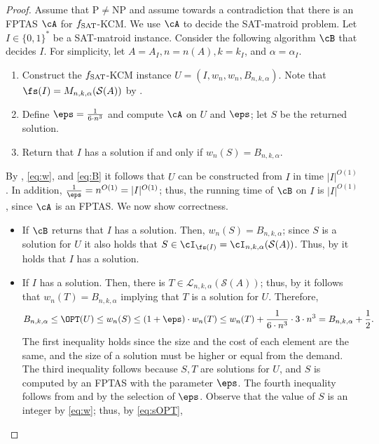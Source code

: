 \begin{proof}
	Assume that P$\neq$NP and assume towards a contradiction that there is an FPTAS $\cA$ for $f_{\textnormal{SAT}}$-KCM. We use $\cA$ to decide the SAT-matroid problem. Let $I \in \{0,1\}^*$ be a SAT-matroid instance. Consider the following algorithm $\cB$ that decides $I$. For simplicity, let $A = A_I, n = n(A), k = k_I$, and $\alpha = \alpha_I$. 
	\begin{enumerate}
		\item Construct the $f_{\textnormal{SAT}}$-KCM instance $%
	U= (I,w_n,w_{n},B_{n,k,\alpha})$. Note that $\fs(I) = M_{n,k,\alpha}(\mathcal{S}(A))$ by . 
		\item Define $\eps = \frac{1}{6 \cdot n^3}$ and compute $\cA$ on $U$ and $\eps$; let $S$ be the returned solution.  
		\item Return that $I$ has a solution if and only if $w_n(S) = B_{n,k,\alpha}$. 
	\end{enumerate}
By , \eqref{eq:w}, and \eqref{eq:B} it follows that $U$ can be constructed from $I$ in time $|I|^{O(1)}$.   In addition, %
$\frac{1}{\eps} =n^{O(1)} =  |I|^{O(1)}$; thus, the running time of $\cB$ on $I$ is $|I|^{O(1)}$, since $\cA$ is an FPTAS. We now show correctness.
	\begin{itemize}
		\item If $\cB$ returns that $I$ has a solution. Then, $w_n(S) = B_{n,k,\alpha}$; since $S$ is a solution for $U$ it also holds that $S \in \cI_{\fs (I)} =  \cI_{n,k,\alpha}(\mathcal{S}(A))$. Thus, by  it holds that $I$ has a solution.  
		\item If $I$ has a solution. Then, there is $T \in \mathcal{L}_{n,k,\alpha}(\mathcal{S}(A))$; thus, by   it follows that $w_n(T) = B_{n,k,\alpha}$ implying that $T$ is a solution for $U$.  Therefore, 
		\begin{equation}
			\label{eq:sOPT}
			B_{n,k,\alpha} \leq \OPT(U) \leq w_n(S) \leq (1+\eps) \cdot w_n(T) \leq  w_n(T)+\frac{1}{6 \cdot n^3} \cdot 3 \cdot n^3 = B_{n,k,\alpha}+\frac{1}{2}.
		\end{equation} 	The first inequality holds since %
		the size and the cost of each element are the same, and the size of a solution must be higher or equal from the demand. The third inequality follows because $S,T$ are solutions for $U$, and $S$ is computed by an FPTAS with the parameter $\eps$. The fourth inequality follows from  and by the selection of $\eps$. Observe that the value of $S$ is an integer by \eqref{eq:w}; thus, by \eqref{eq:sOPT}, %

\end{itemize}
\end{proof}
